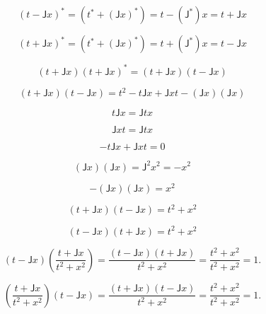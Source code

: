 \documentclass[12pt]{article}
\begin{document}
\begin{equation}
(t-\mathsf{J}x)^{*}=(t^{*}+(\mathsf{J}x)^{*})=t-(\mathsf{J}^{*})x=t+\mathsf{J}x
\end{equation}

\begin{equation}
(t+\mathsf{J}x)^{*}=(t^{*}+(\mathsf{J}x)^{*})=t+(\mathsf{J}^{*})x=t-\mathsf{J}x
\end{equation}

\begin{equation}
(t+\mathsf{J}x)(t+\mathsf{J}x)^{*}=(t+\mathsf{J}x)(t-\mathsf{J}x)
\end{equation}

\begin{equation}
(t+\mathsf{J}x)(t-\mathsf{J}x)=t^2-t\mathsf{J}x+\mathsf{J}xt-(\mathsf{J}x)(\mathsf{J}x)
\end{equation}

\begin{equation}
t\mathsf{J}x=\mathsf{J}tx
\end{equation}

\begin{equation}
\mathsf{J}xt=\mathsf{J}tx
\end{equation}

\begin{equation}
-t\mathsf{J}x+\mathsf{J}xt=0
\end{equation}

\begin{equation}
(\mathsf{J}x)(\mathsf{J}x)=\mathsf{J}^2x^2=-x^2
\end{equation}

\begin{equation}
-(\mathsf{J}x)(\mathsf{J}x)=x^2
\end{equation}

\begin{equation}
(t+\mathsf{J}x)(t-\mathsf{J}x)=t^2+x^2
\end{equation}

\begin{equation}
(t-\mathsf{J}x)(t+\mathsf{J}x)=t^2+x^2
\end{equation}

\begin{equation}
(t-\mathsf{J}x)\left(\frac{t+\mathsf{J}x}{t^{2}+x^{2}}\right)
=\frac{(t-\mathsf{J}x)(t+\mathsf{J}x)}{t^{2}+x^{2}}
=\frac{t^{2}+x^{2}}{t^{2}+x^{2}}
=1.
\end{equation}

\begin{equation}
\left(\frac{t+\mathsf{J}x}{t^{2}+x^{2}}\right)(t-\mathsf{J}x)
=\frac{(t+\mathsf{J}x)(t-\mathsf{J}x)}{t^{2}+x^{2}}
=\frac{t^{2}+x^{2}}{t^{2}+x^{2}}
=1.
\end{equation}
\end{document}

